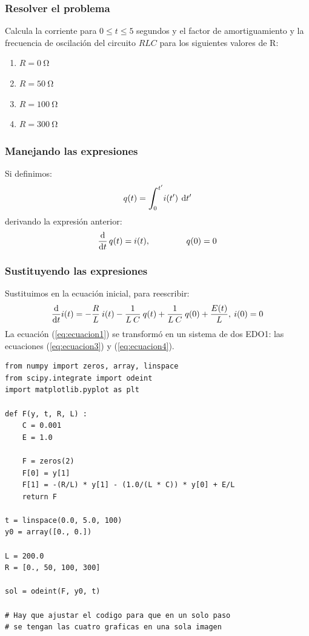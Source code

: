 \documentclass[12pt]{beamer}
\begin{document}
\begin{frame}
\frametitle{Resolver el problema}
Calcula la corriente para $0 \leq t \leq 5$ segundos y el factor de amortiguamiento y la frecuencia de oscilación del circuito $RLC$ para los siguientes valores de R:
\pause
{}
\begin{enumerate}[<+->]
\item $R = \SI{0}{\ohm}$
\item $R = \SI{50}{\ohm}$
\item $R = \SI{100}{\ohm}$
\item $R = \SI{300}{\ohm}$
\end{enumerate}
\end{frame}
\begin{frame}
\frametitle{Manejando las expresiones}
Si definimos:
\pause
\begin{equation}\label{eq:ecuacion2}
q (t) = \scaleint{6ex}_{\bs 0}^{\pderivada{t}} i (\pderivada{t}) \: \dd{\pderivada{t}}
\end{equation}
\pause
derivando la expresión anterior:
\pause
\begin{equation}\label{eq:ecuacion3}
\dv{t} \, q(t) = i (t), \hspace{1.5cm} q (0) = 0
\end{equation}
\end{frame}
\begin{frame}
\frametitle{Sustituyendo las expresiones}
Sustituimos en la ecuación inicial, para reescribir:
\pause
\begin{equation}\label{eq:ecuacion4}
\dv{t} i (t) = -\dfrac{R}{L} \: i (t) - \dfrac{1}{L \: C} \: q(t) + \dfrac{1}{L \: C} \: q(0) + \dfrac{E (t)}{L}, \: i(0) =  0 
\end{equation}
La ecuación (\ref{eq:ecuacion1}) se transformó en un sistema de dos EDO1: las ecuaciones (\ref{eq:ecuacion3}) y (\ref{eq:ecuacion4}).
\end{frame}
\begin{frame}
\begin{lstlisting}[caption=Código para el circuito RLC]
from numpy import zeros, array, linspace
from scipy.integrate import odeint
import matplotlib.pyplot as plt

def F(y, t, R, L) : 
    C = 0.001
    E = 1.0
            
    F = zeros(2)
    F[0] = y[1]
    F[1] = -(R/L) * y[1] - (1.0/(L * C)) * y[0] + E/L
    return F

t = linspace(0.0, 5.0, 100)
y0 = array([0., 0.])

L = 200.0
R = [0., 50, 100, 300]

sol = odeint(F, y0, t)

# Hay que ajustar el codigo para que en un solo paso
# se tengan las cuatro graficas en una sola imagen
\end{lstlisting}
\end{frame}
\end{document}
